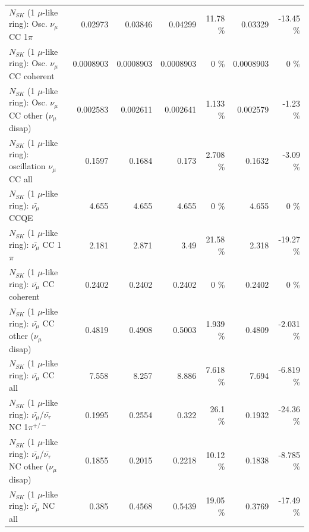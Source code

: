 \begin{table}
\begin{tabular}{| l | r | r | r  r | r  r |}
                          $N_{SK}$ (1 $\mu$-like ring): Osc. $\nu_\mu$ CC 1$\pi$ &         0.02973 &         0.03846 &         0.04299 &    11.78 \%  &         0.03329 &   -13.45 \%  \\ 
                        $N_{SK}$ (1 $\mu$-like ring): Osc. $\nu_\mu$ CC coherent &       0.0008903 &       0.0008903 &       0.0008903 &        0 \%  &       0.0008903 &        0 \%  \\ 
         $N_{SK}$ (1 $\mu$-like ring): Osc. $\nu_\mu$ CC other ($\nu_\mu$ disap) &        0.002583 &        0.002611 &        0.002641 &    1.133 \%  &        0.002579 &    -1.23 \%  \\ 
                      $N_{SK}$ (1 $\mu$-like ring): oscillation $\nu_\mu$ CC all &          0.1597 &          0.1684 &           0.173 &    2.708 \%  &          0.1632 &    -3.09 \%  \\ 
\hline
\hline
                              $N_{SK}$ (1 $\mu$-like ring): $\bar{\nu_\mu}$ CCQE &           4.655 &           4.655 &           4.655 &        0 \%  &           4.655 &        0 \%  \\ 
                         $N_{SK}$ (1 $\mu$-like ring): $\bar{\nu_\mu}$ CC 1$\pi$ &           2.181 &           2.871 &            3.49 &    21.58 \%  &           2.318 &   -19.27 \%  \\ 
                       $N_{SK}$ (1 $\mu$-like ring): $\bar{\nu_\mu}$ CC coherent &          0.2402 &          0.2402 &          0.2402 &        0 \%  &          0.2402 &        0 \%  \\ 
        $N_{SK}$ (1 $\mu$-like ring): $\bar{\nu_\mu}$ CC other ($\nu_\mu$ disap) &          0.4819 &          0.4908 &          0.5003 &    1.939 \%  &          0.4809 &   -2.031 \%  \\ 
                          $N_{SK}$ (1 $\mu$-like ring): $\bar{\nu_{\mu}}$ CC all &           7.558 &           8.257 &           8.886 &    7.618 \%  &           7.694 &   -6.819 \%  \\ 
\hline
  $N_{SK}$ (1 $\mu$-like ring): $\bar{\nu_\mu}$/$\bar{\nu_\tau}$ NC 1$\pi^{+/-}$ &          0.1995 &          0.2554 &           0.322 &     26.1 \%  &          0.1932 &   -24.36 \%  \\ 
$N_{SK}$ (1 $\mu$-like ring): $\bar{\nu_\mu}$/$\bar{\nu_\tau}$ NC other ($\nu_\mu$ disap) &          0.1855 &          0.2015 &          0.2218 &    10.12 \%  &          0.1838 &   -8.785 \%  \\ 
                          $N_{SK}$ (1 $\mu$-like ring): $\bar{\nu_{\mu}}$ NC all &           0.385 &          0.4568 &          0.5439 &    19.05 \%  &          0.3769 &   -17.49 \%  \\ 

\end{tabular}
\end{table}
